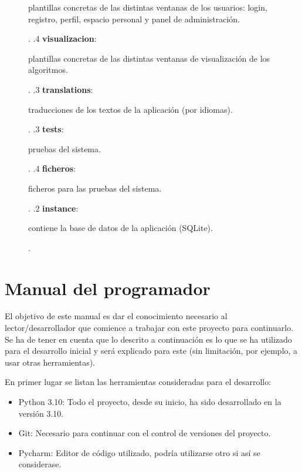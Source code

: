 \begin{figure}[H]
{\begin{minipage}[t]{6cm}
            plantillas concretas de las distintas ventanas de los usuarios: login, registro, perfil, espacio personal y panel de administración{.}\\
        \end{minipage}.
        .4 \textbf{visualizacion}: \begin{minipage}[t]{6cm}
            plantillas concretas de las distintas ventanas de visualización de los algoritmos{.}\\
        \end{minipage}.
        .3 \textbf{translations}: \begin{minipage}[t]{6cm}
            traducciones de los textos de la aplicación (por idiomas){.}\\
        \end{minipage}.
        .3 \textbf{tests}: \begin{minipage}[t]{10cm}
            pruebas del sistema{.}\\
        \end{minipage}.
        .4 \textbf{ficheros}: \begin{minipage}[t]{10cm}
            ficheros para las pruebas del sistema{.}\\
        \end{minipage}.
        .2 \textbf{instance}: \begin{minipage}[t]{10cm} contiene
        la base de datos de la aplicación (SQLite){.}\\
            \end{minipage}.
    }
\end{figure}

\section{Manual del programador}
El objetivo de este manual es dar el conocimiento necesario al
lector/desarrollador que comience a trabajar con este proyecto para continuarlo.
Se ha de tener en cuenta que lo descrito a continuación es lo que se ha
utilizado para el desarrollo inicial y será explicado para este (sin limitación,
por ejemplo, a usar otras herramientas).

En primer lugar se listan las herramientas consideradas para el desarrollo:
\begin{itemize}
    \item Python 3.10: Todo el proyecto, desde su inicio, ha sido desarrollado en la versión 3.10.
    \item Git: Necesario para continuar con el control de versiones del proyecto.
    \item Pycharm: Editor de código utilizado, podría utilizarse otro si así se considerase.
\end{itemize}

